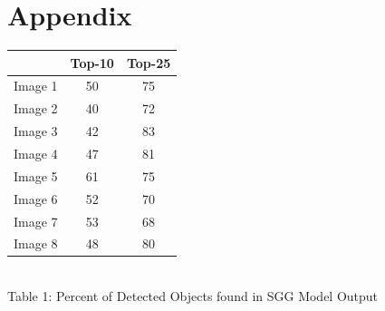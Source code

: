 \documentclass[letterpaper, 10 pt, conference]{ieeeconf}  %
\begin{document}
\section{Appendix}
\vspace*{3mm}
\centering
    \begin{tabular}{|c|c|c|}
        \hline
         & Top-10 & Top-25 \\
        \hline
        Image 1 & 50 & 75\\
        Image 2 & 40 & 72\\
        Image 3 & 42 & 83\\
        Image 4 & 47 & 81\\
        Image 5 & 61 & 75\\
        Image 6 & 52 & 70\\
        Image 7 & 53 & 68\\
        Image 8 & 48 & 80\\
        \hline

    \end{tabular}
    \\
    \vspace*{3mm}
    {Table 1: Percent of Detected Objects found in SGG Model Output}
    



\end{document}
